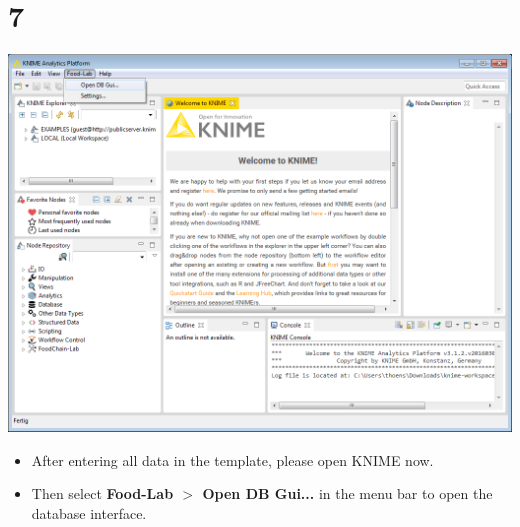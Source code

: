 \documentclass{beamer}
\begin{document}
\section{7}
\begin{frame}
	\begin{center}
  		\includegraphics[height=0.6\textheight]{7.png}
	\end{center}
	\begin{itemize}
		\item After entering all data in the template, please open KNIME now.
		\item Then select \textbf{Food-Lab $>$ Open DB Gui...} in the menu bar to open the database interface.
	\end{itemize}
\end{frame}
\end{document}
